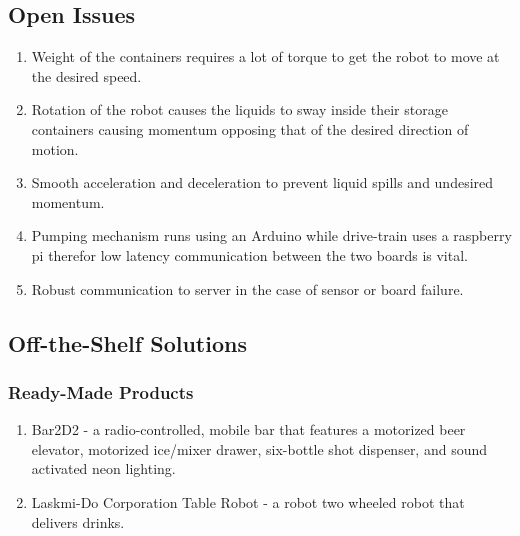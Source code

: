 \documentclass [11pt]{article}
\begin{document}
\subsection{Open Issues}
	\begin{enumerate}[label=\textbf{(\roman*)}]
		\item Weight of the containers requires a lot of torque to get the robot to move at the desired speed.
		\item Rotation of the robot causes the liquids to sway inside their storage containers causing momentum opposing that of the desired direction of motion.
		\item Smooth acceleration and deceleration to prevent liquid spills and undesired momentum.
		\item Pumping mechanism runs using an Arduino while drive-train uses a raspberry pi therefor low latency communication between the two boards is vital.
		\item Robust communication to server in the case of sensor or board failure.	
	\end{enumerate}

\subsection{Off-the-Shelf Solutions}

\subsubsection{Ready-Made Products}
	\begin{enumerate}[label=\textbf{(\roman*)}]
		\item Bar2D2 - a radio-controlled, mobile bar that features a motorized beer elevator, motorized ice/mixer drawer, six-bottle shot dispenser, and sound activated neon lighting. 
		\item Laskmi-Do Corporation Table Robot - a robot two wheeled robot that delivers drinks.
	\end{enumerate}
	
\end{document}
